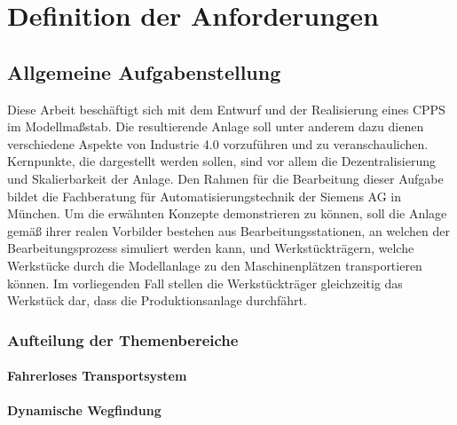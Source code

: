 \chapter{Definition der Anforderungen}

\section{Allgemeine Aufgabenstellung}
Diese Arbeit beschäftigt sich mit dem Entwurf und der Realisierung eines \ac{CPPS} im Modellmaßstab. Die resultierende Anlage soll unter anderem dazu dienen verschiedene Aspekte von Industrie 4.0 vorzuführen und zu veranschaulichen. Kernpunkte, die dargestellt werden sollen, sind vor allem die Dezentralisierung und Skalierbarkeit der Anlage. Den Rahmen für die Bearbeitung dieser Aufgabe bildet die Fachberatung für Automatisierungstechnik der Siemens AG in München. Um die erwähnten Konzepte demonstrieren zu können, soll die Anlage gemäß ihrer realen Vorbilder bestehen aus Bearbeitungsstationen, an welchen der Bearbeitungsprozess simuliert werden kann, und Werkstückträgern, welche Werkstücke durch die Modellanlage zu den Maschinenplätzen transportieren können. Im vorliegenden Fall stellen die Werkstückträger gleichzeitig das Werkstück dar, dass die Produktionsanlage durchfährt.

\subsection{Aufteilung der Themenbereiche}

\subsubsection{Fahrerloses Transportsystem}
\subsubsection{Dynamische Wegfindung}